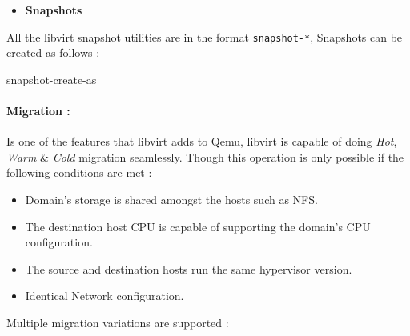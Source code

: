 \documentclass[
  14pt,
  english,
  a4paper,
]{scrreprt}
\newenvironment{Shaded}{}{}
\newcommand{\ExtensionTok}[1]{#1}
\providecommand{\tightlist}{%
  \setlength{\itemsep}{0pt}\setlength{\parskip}{0pt}}
\begin{document}
\begin{itemize}
\tightlist
\item
  \textbf{Snapshots}
\end{itemize}

All the libvirt snapshot utilities are in the format
\texttt{snapshot-*}, Snapshots can be created as follows :

\begin{Shaded}
\begin{Highlighting}[]
\ExtensionTok{snapshot{-}create{-}as}
\end{Highlighting}
\end{Shaded}

\hypertarget{migration}{%
\paragraph{Migration :}\label{migration}}

Is one of the features that libvirt adds to Qemu, libvirt is capable of
doing \emph{Hot}, \emph{Warm} \& \emph{Cold} migration seamlessly.
Though this operation is only possible if the following conditions are
met :

\begin{itemize}
\tightlist
\item
  Domain's storage is shared amongst the hosts such as NFS.
\item
  The destination host CPU is capable of supporting the domain's CPU
  configuration.
\item
  The source and destination hosts run the same hypervisor version.
\item
  Identical Network configuration.
\end{itemize}

Multiple migration variations are supported :
\end{document}
